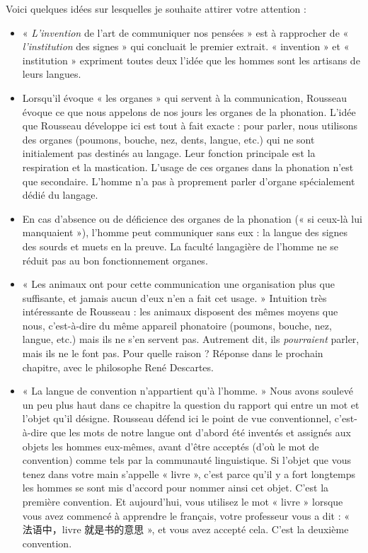 Voici quelques idées sur lesquelles je souhaite attirer votre attention :
\begin{itemize}
\item « \textit{L’invention} de l’art de communiquer nos pensées » est à rapprocher de « \textit{l’institution} des signes » qui concluait le premier extrait. « invention » et « institution » expriment toutes deux l’idée que les hommes sont les artisans de leurs langues.
\item Lorsqu’il évoque « les organes » qui servent à la communication, Rousseau évoque ce que nous appelons de nos jours les organes de la phonation. L’idée que Rousseau développe ici est tout à fait exacte : pour parler, nous utilisons des organes (poumons, bouche, nez, dents, langue, etc.) qui ne sont initialement pas destinés au langage. Leur fonction principale est la respiration et la mastication. L’usage de ces organes dans la phonation n’est que secondaire. L’homme n’a pas à proprement parler d’organe spécialement dédié du langage.
\item En cas d’absence ou de déficience des organes de la phonation (« si ceux-là lui manquaient »), l’homme peut communiquer sans eux : la langue des signes des sourds et muets en la preuve. La faculté langagière de l’homme ne se réduit pas au bon fonctionnement organes.
\item « Les animaux ont pour cette communication une organisation plus que suffisante, et jamais aucun d’eux n’en a fait cet usage. » Intuition très intéressante de Rousseau : les animaux disposent des mêmes moyens que nous, c’est-à-dire du même appareil phonatoire (poumons, bouche, nez, langue, etc.) mais ils ne s’en servent pas. Autrement dit, ils \textit{pourraient} parler, mais ils ne le font pas. Pour quelle raison ? Réponse dans le prochain chapitre, avec le philosophe René Descartes.
\item « La langue de convention n’appartient qu’à l’homme. » Nous avons soulevé un peu plus haut dans ce chapitre la question du rapport qui entre un mot et l’objet qu’il désigne. Rousseau défend ici le point de vue conventionnel, c’est-à-dire que les mots de notre langue ont d’abord été inventés et assignés aux objets les hommes eux-mêmes, avant d’être acceptés (d’où le mot de convention) comme tels par la communauté linguistique. Si l’objet que vous tenez dans votre main s’appelle « livre », c’est parce qu’il y a fort longtemps les hommes se sont mis d’accord pour nommer ainsi cet objet. C’est la première convention. Et aujourd’hui, vous utilisez le mot « livre » lorsque vous avez commencé à apprendre le français, votre professeur vous a dit : « 法语中，livre 就是书的意思 », et vous avez accepté cela. C’est la deuxième convention.
\end{itemize}
